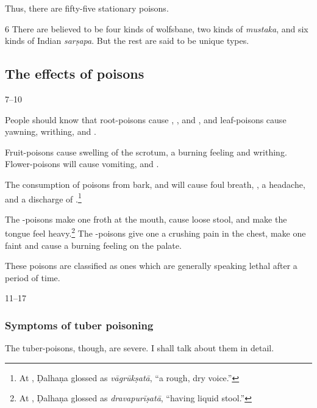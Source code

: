 \begin{translation}
    Thus, there are fifty-five stationary poisons.
    
    \item[6] There are believed to be four kinds of wolfsbane, two kinds of
\emph{mustaka}, and six kinds of Indian \emph{sarṣapa}.  But the rest are said
to be unique types.
    
    
    
    \subsection{The effects of poisons}
    \item[7--10]
    
People should know that root-poisons cause ,
, and , and  leaf-poisons
cause yawning, writhing, and .
    
 Fruit-poisons cause swelling of the
   scrotum, a burning feeling and writhing.  Flower-poisons will
    cause vomiting,  and .  
    
The consumption of poisons from bark,  and
 will cause foul breath, ,
a headache, and a discharge of .\footnote{At
    , Ḍalhaṇa glossed  as
    \emph{vāgrūkṣatā}, “a rough, dry voice.”}
    
    
The -poisons make one froth at the mouth,  cause
loose stool, and make the tongue feel heavy.\footnote{At
    , Ḍalhaṇa glossed  as
    \emph{dravapurīṣatā}, “having liquid stool.” }  The
    -poisons give one a crushing pain in the chest,
    make one faint and cause a burning feeling on the palate.
    
    These poisons
    are classified as ones which are generally speaking lethal after a period of time.
    
    \item[11--17]
    
    \subsubsection{Symptoms of tuber poisoning}
    The tuber-poisons, though, are severe.  I shall talk about them in detail.
    
    

\end{translation}

